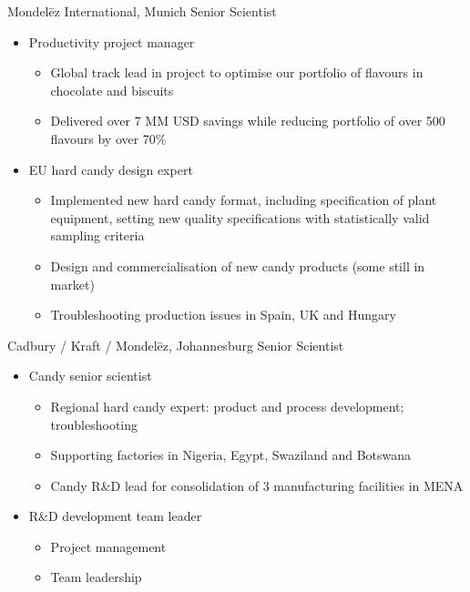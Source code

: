 \documentclass[%
               doublesided,
               paper=a4,
               fontsize=10pt
              ]{my-resume}
\begin{document}
{    
        {Mondelēz International, Munich}
        {Senior Scientist}
        {\begin{itemize}
            \item Productivity project manager
            \begin{itemize}
                \item Global track lead in project to optimise our
                  portfolio of flavours in chocolate and biscuits
                \item Delivered over 7 MM USD savings while reducing
                  portfolio of over 500 flavours by over 70\%
            \end{itemize}
            \item EU hard candy design expert
            \begin{itemize}
                \item Implemented new hard candy format, including
                  specification of plant equipment, setting new
                  quality specifications with statistically valid
                  sampling criteria
                \item Design and commercialisation of new candy
                  products (some still in market)
                \item Troubleshooting production issues in Spain, UK
                  and Hungary
            \end{itemize}
        \end{itemize}}
    
        {Cadbury / Kraft / Mondelēz, Johannesburg}
        {Senior Scientist}
        {\begin{itemize}
            \item Candy senior scientist
            \begin{itemize}
                \item Regional hard candy expert: product and process
                  development; troubleshooting
                \item Supporting factories in Nigeria, Egypt,
                  Swaziland and Botswana
                \item Candy R\&D lead for consolidation of 3
                  manufacturing facilities in MENA
            \end{itemize}
            \item R\&D development team leader
            \begin{itemize}
                \item Project management
                \item Team leadership
            \end{itemize}
        \end{itemize}}

}
\makebody
\clearpage
\end{document}
